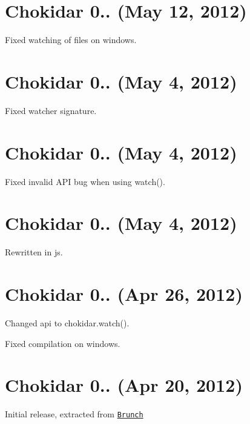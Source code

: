 \section*{Chokidar 0.. (May 12, 2012)}


\begin{DoxyItemize}
\item Fixed watching of files on windows.
\end{DoxyItemize}

\section*{Chokidar 0.. (May 4, 2012)}


\begin{DoxyItemize}
\item Fixed watcher signature.
\end{DoxyItemize}

\section*{Chokidar 0.. (May 4, 2012)}


\begin{DoxyItemize}
\item Fixed invalid A\+PI bug when using {\ttfamily watch()}.
\end{DoxyItemize}

\section*{Chokidar 0.. (May 4, 2012)}


\begin{DoxyItemize}
\item Rewritten in js.
\end{DoxyItemize}

\section*{Chokidar 0.. (Apr 26, 2012)}


\begin{DoxyItemize}
\item Changed api to {\ttfamily chokidar.\+watch()}.
\item Fixed compilation on windows.
\end{DoxyItemize}

\section*{Chokidar 0.. (Apr 20, 2012)}


\begin{DoxyItemize}
\item Initial release, extracted from \href{https://github.com/brunch/brunch/blob/9847a065aea300da99bd0753f90354cde9de1261/src/helpers.coffee#L66}{\tt Brunch} 
\end{DoxyItemize}